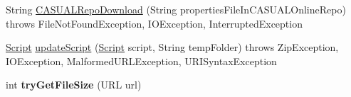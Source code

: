 \begin{DoxyCompactItemize}
\item 
String \hyperlink{class_c_a_s_u_a_l_1_1network_1_1_c_a_s_u_a_l_updates_ac425655d3ed96b358537d184c4cd1b1d}{C\-A\-S\-U\-A\-L\-Repo\-Download} (String properties\-File\-In\-C\-A\-S\-U\-A\-L\-Online\-Repo)  throws File\-Not\-Found\-Exception, I\-O\-Exception, Interrupted\-Exception 
\item 
\hyperlink{class_c_a_s_u_a_l_1_1caspac_1_1_script}{Script} \hyperlink{class_c_a_s_u_a_l_1_1network_1_1_c_a_s_u_a_l_updates_a75b4ba0d0a0852256d7af16b03c48505}{update\-Script} (\hyperlink{class_c_a_s_u_a_l_1_1caspac_1_1_script}{Script} script, String temp\-Folder)  throws Zip\-Exception, I\-O\-Exception, Malformed\-U\-R\-L\-Exception, U\-R\-I\-Syntax\-Exception 
\item 
\hypertarget{class_c_a_s_u_a_l_1_1network_1_1_c_a_s_u_a_l_updates_a8307b94648f683eae2d22ae179005bb4}{int {\bfseries try\-Get\-File\-Size} (U\-R\-L url)}\label{class_c_a_s_u_a_l_1_1network_1_1_c_a_s_u_a_l_updates_a8307b94648f683eae2d22ae179005bb4}


\end{DoxyCompactItemize}
